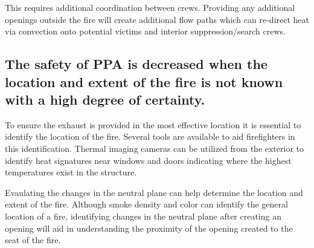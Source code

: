 \documentclass{article}
\begin{document}
This requires additional coordination between crews. Providing any additional openings outside the fire will create additional flow paths which can re-direct heat via convection onto potential victims and interior suppression/search crews. 

\subsection{The safety of PPA is decreased when the location and extent of the fire is not known with a high degree of certainty.}
To ensure the exhaust is provided in the most effective location it is essential to identify the location of the fire. Several tools are available to aid firefighters in this identification. Thermal imaging cameras can be utilized from the exterior to identify heat signatures near windows and doors indicating where the highest temperatures exist in the structure. 

Evaulating the changes in the neutral plane can help determine the location and extent of the fire. Although smoke density and color can identify the general location of a fire, identifying changes in the neutral plane after creating an opening will aid in understanding the proximity of the opening created to the seat of the fire. 
\end{document}
